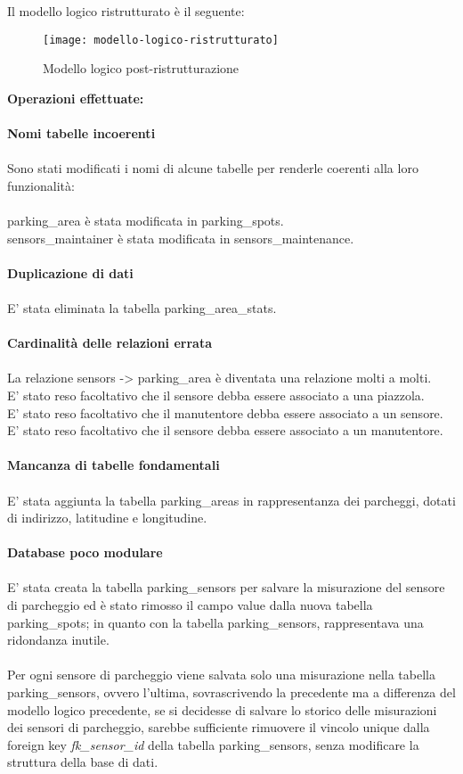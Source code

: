 Il modello logico ristrutturato è il seguente:
\begin{figure}[H]
  \centering
  \texttt{[image: modello-logico-ristrutturato]}
  \caption{Modello logico post-ristrutturazione}
\end{figure}
\leavevmode\newline
\textbf{Operazioni effettuate:}
\\\\
\textbf{Nomi tabelle incoerenti}
\\\\
Sono stati modificati i nomi di alcune tabelle per renderle coerenti alla loro funzionalità:
\\\\
parking\_area è stata modificata in parking\_spots.
\\
sensors\_maintainer è stata modificata in sensors\_maintenance.
\\\\
\textbf{Duplicazione di dati}
\\\\
E' stata eliminata la tabella parking\_area\_stats.
\\\\
\textbf{Cardinalità delle relazioni errata}
\\\\
La relazione sensors -> parking\_area è diventata una relazione molti a molti.
\\
E' stato reso facoltativo che il sensore debba essere associato a una piazzola.
\\
E' stato reso facoltativo che il manutentore debba essere associato a un sensore.
\\
E' stato reso facoltativo che il sensore debba essere associato a un manutentore.
\\\\
\textbf{Mancanza di tabelle fondamentali}
\\\\
E' stata aggiunta la tabella parking\_areas in rappresentanza dei parcheggi, dotati di indirizzo, latitudine e 
longitudine.
\\\\
\textbf{Database poco modulare}
\\\\
E' stata creata la tabella parking\_sensors per salvare la misurazione del sensore di parcheggio ed è
stato rimosso il campo value dalla nuova tabella parking\_spots; in quanto con la tabella parking\_sensors,
rappresentava una ridondanza inutile.
\\\\
Per ogni sensore di parcheggio viene salvata solo una misurazione nella tabella parking\_sensors, ovvero
l'ultima, sovrascrivendo la precedente ma a differenza del modello logico precedente, se 
si decidesse di salvare lo storico delle misurazioni dei sensori di parcheggio, sarebbe sufficiente rimuovere
il vincolo unique dalla foreign key \textit{fk\_sensor\_id} della tabella parking\_sensors, senza modificare la struttura della base di dati.